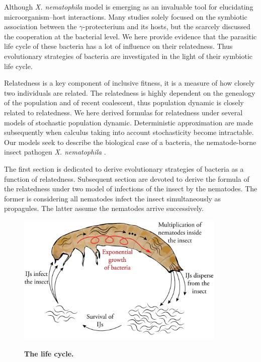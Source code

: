 \documentclass[10pt]{article}
\newcommand{\Xnema}{\textit{X. nematophila} }
\begin{document}
\begin{multicols}{2}
Although \Xnema model is emerging as an invaluable tool for elucidating microorganism–host interactions. Many studies solely focused on the symbiotic association between the $\gamma$-protecterium and its hosts, but the scarcely discussed the cooperation at the bacterial level. We here provide evidence that the parasitic life cycle of these bacteria has a lot of influence on their relatedness. Thus evolutionary strategies of bacteria are investigated in the light of their symbiotic life cycle.

Relatedness is a key component of inclusive fitness, it is a measure of how closely two individuals are related. The relatedness is highly dependent on the genealogy of the population and of recent coalescent, thus population dynamic is closely related to relatedness. We here derived formulas for relatedness under several models of stochastic population dynamic. Deterministic approximation are made subsequently when calculus taking into account stochasticity become intractable. Our models seek to describe the biological case of a bacteria, the nematode-borne insect pathogen \Xnema.

The first section is dedicated to derive evolutionary strategies of bacteria as a function of relatedness. Subsequent section are devoted to derive the formula of the relatedness under two  model of infections of the insect by the nematodes. The former is considering all nematodes infect the insect simultaneously as propagules. The latter assume the nematodes arrive successively.
\begin{figure}[ht]
	  \centering
	  \label{fig:life_cycle}
       \includegraphics[width=10.0cm]{Figures/Life_cycle.png}\\
		\caption{ \textbf{The life cycle.}
		}
\end{figure}

\end{multicols}
\end{document}
